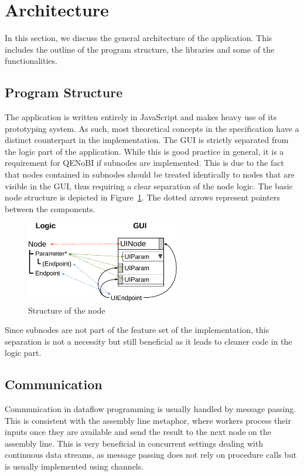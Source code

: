 \documentclass[11pt,a4paper]{globis-book}
\begin{document}
\section{Architecture}
In this section, we discuss the general architecture of the application. This includes the outline of the program structure, the libraries and some of the functionalities.

\subsection{Program Structure}
The application is written entirely in JavaScript and makes heavy use of its prototyping system. As such, most theoretical concepts in the specification have a distinct counterpart in the implementation. The GUI is strictly separated from the logic part of the application. While this is good practice in general, it is a requirement for QENoBI if subnodes are implemented. This is due to the fact that nodes contained in subnodes should be treated identically to nodes that are visible in the GUI, thus requiring a clear separation of the node logic. The basic node structure is depicted in Figure~\ref{fig:node_structure}. The dotted arrows represent pointers between the components.

\begin{figure}[h]
  \centering
  \includegraphics[width=0.6\textwidth]{resources/NodeStructure.pdf}
  \caption{Structure of the node}
  \label{fig:node_structure}
\end{figure}

Since subnodes are not part of the feature set of the implementation, this separation is not a necessity but still beneficial as it leads to cleaner code in the logic part.

\subsection{Communication}
Communication in dataflow programming is usually handled by message passing. This is consistent with the assembly line metaphor, where workers process their inputs once they are available and send the result to the next node on the assembly line. This is very beneficial in concurrent settings dealing with continuous data streams, as message passing does not rely on procedure calls but is usually implemented using channels.
\end{document}

